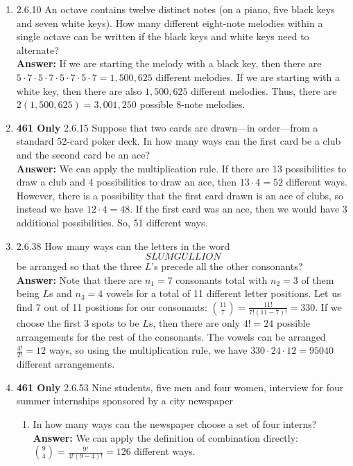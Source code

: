 \documentclass{article}
\begin{document}
\begin{enumerate}
        \item 2.6.10 An octave contains twelve distinct notes (on a piano, five black keys and seven white keys). How many different eight-note melodies within a single octave can be written if the black keys and white keys need to alternate?\\
        \textbf{Answer: }If we are starting the melody with a black key, then there are $5 \cdot 7 \cdot 5 \cdot 7 \cdot 5 \cdot 7 \cdot 5 \cdot 7 = 1,500,625$ different melodies. If we are starting with a white key, then there are also $1,500,625$ different melodies. Thus, there are $2(1,500,625) = 3,001,250$ possible 8-note melodies.\\
        
        \item \textbf{461 Only }2.6.15 Suppose that two cards are drawn—in order—from a standard 52-card poker deck. In how many ways can the first card be a club and the second card be an ace?\\
        \textbf{Answer: }We can apply the multiplication rule. If there are 13 possibilities to draw a club and 4 possibilities to draw an ace, then $13 \cdot 4 = 52$ different ways. However, there is a possibility that the first card drawn is an ace of clubs, so instead we have $12 \cdot 4 = 48$. If the first card was an ace, then we would have 3 additional possibilities. So, 51 different ways. \\

        \item 2.6.38 How many ways can the letters in the word\\
            \[SLUMGULLION\]
        be arranged so that the three $L$’s precede all the other consonants?\\
        \textbf{Answer: }Note that there are $n_1 = 7$ consonants total with $n_2 = 3$ of them being $L$s and $n_3 = 4$ vowels for a total of 11 different letter positions. Let us find 7 out of 11 positions for our consonants: $\binom{11}{7} = \frac{11!}{7!(11-7)!} = 330$. If we choose the first 3 spots to be $L$s, then there are only $4! = 24$ possible arrangements for the rest of the consonants. The vowels can be arranged $\frac{4!}{2!} = 12$ ways, so using the multiplication rule, we have $330 \cdot 24 \cdot 12 = 95040$ different arrangements.\\
        
        \item \textbf{461 Only }2.6.53 Nine students, five men and four women, interview for four summer internships sponsored by a city newspaper\\
            \begin{enumerate}
                \item In how many ways can the newspaper choose a set of four interns?\\
                \textbf{Answer: }We can apply the definition of combination directly: $\binom{9}{4} = \frac{9!}{4!(9-4)!} = 126$ different ways.\\
                

\end{enumerate}
\end{enumerate}
\end{document}
